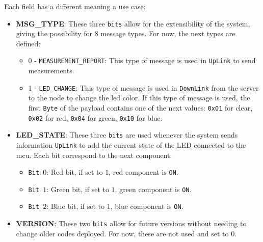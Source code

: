 Each field has a different meaning a use case:
\begin{itemize}
    \item \textbf{MSG\_TYPE}: These three \texttt{bits} allow for the extensibility of the system, giving the possibility for 8 message types. For now, the next types are defined:
    \begin{itemize}
        \item 0 - \texttt{MEASUREMENT\_REPORT}: This type of message is used in \texttt{UpLink} to send measurements.
        \item 1 - \texttt{LED\_CHANGE}: This type of message is used in \texttt{DownLink} from the server to the node to change the led color. If this type of message is used, the first \texttt{Byte} of the payload contains one of the next values: 
        \texttt{0x01} for clear, \texttt{0x02} for red, \texttt{0x04} for green, \texttt{0x10} for blue.
    \end{itemize}
    \item \textbf{LED\_STATE}: These three \texttt{bits} are used whenever the system sends information \texttt{UpLink} to add the current state of the LED connected to the \acrshort{mcu}. Each bit correspond to the next component:
    \begin{itemize}
        \item \texttt{Bit $0$}: Red bit, if set to $1$, red component is \texttt{ON}.
        \item \texttt{Bit $1$}: Green bit, if set to $1$, green component is \texttt{ON}.
        \item \texttt{Bit $2$}: Blue bit, if set to $1$, blue component is \texttt{ON}.
    \end{itemize}
    \item \textbf{VERSION}: These two \texttt{bits} allow for future versions without needing to change older codes deployed. For now, these are not used and set to $0$.
\end{itemize}